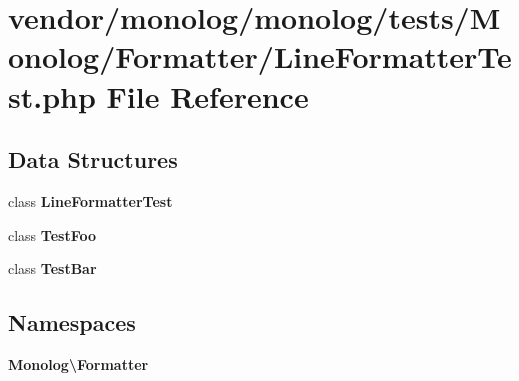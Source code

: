 \section{vendor/monolog/monolog/tests/\+Monolog/\+Formatter/\+Line\+Formatter\+Test.php File Reference}
\label{_line_formatter_test_8php}
\subsection*{Data Structures}
\begin{DoxyCompactItemize}
\item 
class {\bf Line\+Formatter\+Test}
\item 
class {\bf Test\+Foo}
\item 
class {\bf Test\+Bar}
\end{DoxyCompactItemize}
\subsection*{Namespaces}
\begin{DoxyCompactItemize}
\item 
 {\bf Monolog\textbackslash{}\+Formatter}
\end{DoxyCompactItemize}
